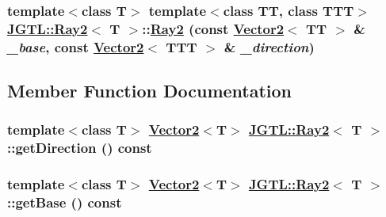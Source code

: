 \hypertarget{class_j_g_t_l_1_1_ray2_5ab2591d6df17a32373b34259913fbe2}{
\subsubsection[Ray2]{\setlength{\rightskip}{0pt plus 5cm}template$<$class T$>$ template$<$class TT, class TTT$>$ \hyperlink{class_j_g_t_l_1_1_ray2}{JGTL::Ray2}$<$ T $>$::\hyperlink{class_j_g_t_l_1_1_ray2}{Ray2} (const \hyperlink{class_j_g_t_l_1_1_vector2}{Vector2}$<$ TT $>$ \& {\em \_\-base}, const \hyperlink{class_j_g_t_l_1_1_vector2}{Vector2}$<$ TTT $>$ \& {\em \_\-direction})}}
\label{class_j_g_t_l_1_1_ray2_5ab2591d6df17a32373b34259913fbe2}




\subsection{Member Function Documentation}
\hypertarget{class_j_g_t_l_1_1_ray2_e3d5c3d3ba2693d7904dabfd6407cd32}{
\subsubsection[getDirection]{\setlength{\rightskip}{0pt plus 5cm}template$<$class T$>$ \hyperlink{class_j_g_t_l_1_1_vector2}{Vector2}$<$T$>$ \hyperlink{class_j_g_t_l_1_1_ray2}{JGTL::Ray2}$<$ T $>$::get\-Direction () const}}
\label{class_j_g_t_l_1_1_ray2_e3d5c3d3ba2693d7904dabfd6407cd32}


\hypertarget{class_j_g_t_l_1_1_ray2_151f4c434cde6776eb9183def4529944}{
\subsubsection[getBase]{\setlength{\rightskip}{0pt plus 5cm}template$<$class T$>$ \hyperlink{class_j_g_t_l_1_1_vector2}{Vector2}$<$T$>$ \hyperlink{class_j_g_t_l_1_1_ray2}{JGTL::Ray2}$<$ T $>$::get\-Base () const}}
\label{class_j_g_t_l_1_1_ray2_151f4c434cde6776eb9183def4529944}


